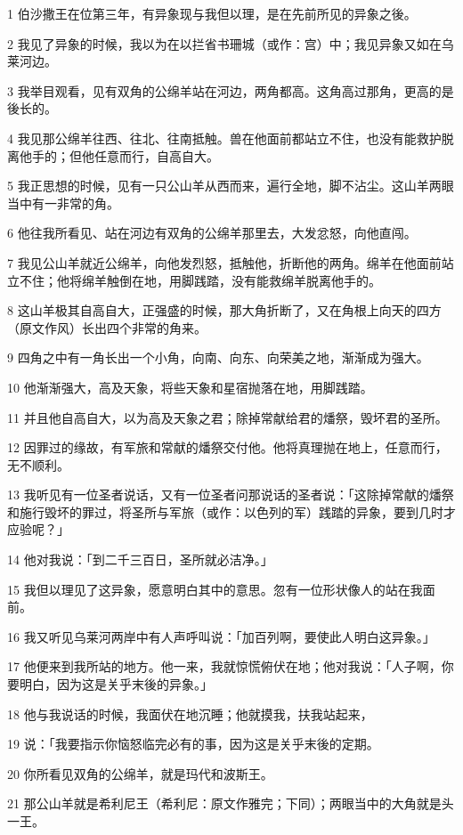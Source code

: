 \par 1 伯沙撒王在位第三年，有异象现与我但以理，是在先前所见的异象之後。
\par 2 我见了异象的时候，我以为在以拦省书珊城（或作：宫）中；我见异象又如在乌莱河边。
\par 3 我举目观看，见有双角的公绵羊站在河边，两角都高。这角高过那角，更高的是後长的。
\par 4 我见那公绵羊往西、往北、往南抵触。兽在他面前都站立不住，也没有能救护脱离他手的；但他任意而行，自高自大。
\par 5 我正思想的时候，见有一只公山羊从西而来，遍行全地，脚不沾尘。这山羊两眼当中有一非常的角。
\par 6 他往我所看见、站在河边有双角的公绵羊那里去，大发忿怒，向他直闯。
\par 7 我见公山羊就近公绵羊，向他发烈怒，抵触他，折断他的两角。绵羊在他面前站立不住；他将绵羊触倒在地，用脚践踏，没有能救绵羊脱离他手的。
\par 8 这山羊极其自高自大，正强盛的时候，那大角折断了，又在角根上向天的四方（原文作风）长出四个非常的角来。
\par 9 四角之中有一角长出一个小角，向南、向东、向荣美之地，渐渐成为强大。
\par 10 他渐渐强大，高及天象，将些天象和星宿抛落在地，用脚践踏。
\par 11 并且他自高自大，以为高及天象之君；除掉常献给君的燔祭，毁坏君的圣所。
\par 12 因罪过的缘故，有军旅和常献的燔祭交付他。他将真理抛在地上，任意而行，无不顺利。
\par 13 我听见有一位圣者说话，又有一位圣者问那说话的圣者说：「这除掉常献的燔祭和施行毁坏的罪过，将圣所与军旅（或作：以色列的军）践踏的异象，要到几时才应验呢？」
\par 14 他对我说：「到二千三百日，圣所就必洁净。」
\par 15 我但以理见了这异象，愿意明白其中的意思。忽有一位形状像人的站在我面前。
\par 16 我又听见乌莱河两岸中有人声呼叫说：「加百列啊，要使此人明白这异象。」
\par 17 他便来到我所站的地方。他一来，我就惊慌俯伏在地；他对我说：「人子啊，你要明白，因为这是关乎末後的异象。」
\par 18 他与我说话的时候，我面伏在地沉睡；他就摸我，扶我站起来，
\par 19 说：「我要指示你恼怒临完必有的事，因为这是关乎末後的定期。
\par 20 你所看见双角的公绵羊，就是玛代和波斯王。
\par 21 那公山羊就是希利尼王（希利尼：原文作雅完；下同）；两眼当中的大角就是头一王。
